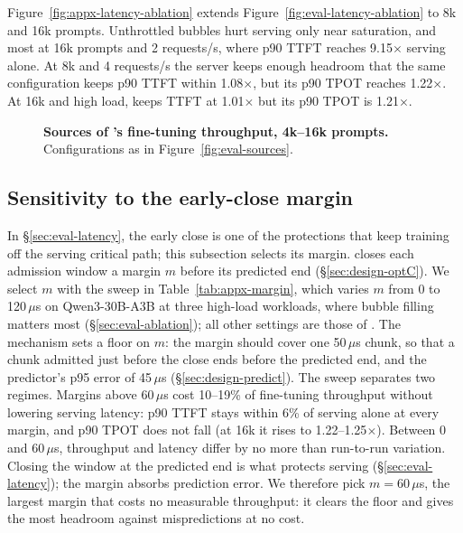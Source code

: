 Figure~\ref{fig:appx-latency-ablation} extends
Figure~\ref{fig:eval-latency-ablation} to 8k and 16k prompts. Unthrottled
bubbles hurt serving only near saturation, and most at 16k prompts and
2 requests/s, where p90 \ac{TTFT} reaches 9.15$\times$ serving alone.
At 8k and 4 requests/s the server keeps enough headroom that the same
configuration keeps p90 \ac{TTFT} within 1.08$\times$, but its p90
\ac{TPOT} reaches 1.22$\times$. At 16k and high load, \sys{}
keeps \ac{TTFT} at 1.01$\times$ but its p90 \ac{TPOT} is 1.21$\times$.

\begin{figure}[t]
  \begin{minipage}[t]{\columnwidth}
    \vspace{0pt}\centering
  \caption{\textbf{Mechanisms that protect serving latency, 4k--16k
    prompts.} Rows: fine-tuning throughput, p90 \ac{TTFT} and p90
    \ac{TPOT} relative to serving alone. Configurations as in
    Figure~\ref{fig:eval-latency-ablation}.}
  \label{fig:appx-latency-ablation}
  \end{minipage}\hfill
  \begin{minipage}[t]{\columnwidth}
    \vspace{0pt}\centering
  \caption{\textbf{Sources of \sys{}'s fine-tuning throughput, 4k--16k
    prompts.} Configurations as in Figure~\ref{fig:eval-sources}.}
  \label{fig:appx-sources}
  \end{minipage}
\end{figure}

\subsection{Sensitivity to the early-close margin}
\label{sec:appx-margin}

In \S\ref{sec:eval-latency}, the early close is one of the protections
that keep training off the serving critical path; this subsection
selects its margin. \sys{} closes each admission window a margin $m$ before its predicted
end (\S\ref{sec:design-optC}). We select $m$ with the sweep in
Table~\ref{tab:appx-margin}, which varies $m$ from 0 to 120\,$\mu$s on
Qwen3-30B-A3B at three high-load workloads, where bubble filling
matters most (\S\ref{sec:eval-ablation}); all other settings are those
of \sys{}. The mechanism sets a floor on $m$: the margin should cover
one 50\,$\mu$s chunk, so that a chunk admitted just before
the close ends before the predicted end, and the predictor's p95 error
of 45\,$\mu$s (\S\ref{sec:design-predict}). The
sweep separates two regimes. Margins above 60\,$\mu$s cost 10--19\% of
fine-tuning throughput without lowering serving latency: p90 \ac{TTFT}
stays within 6\% of serving alone at every margin, and p90 \ac{TPOT}
does not fall (at 16k it rises to 1.22--1.25$\times$). Between 0 and
60\,$\mu$s, throughput and latency differ by no more than run-to-run
variation. Closing the window at the predicted end is what protects
serving (\S\ref{sec:eval-latency}); the margin absorbs prediction
error. We therefore pick $m=60\,\mu$s, the largest margin that costs no
measurable throughput: it clears the floor and gives the most headroom
against mispredictions at no cost.


